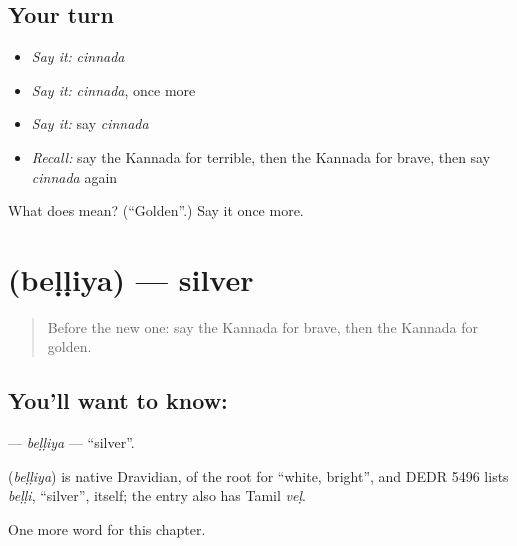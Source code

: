 \subsection*{Your turn}
\begin{itemize}
\raggedright
  \item \emph{Say it:} \emph{cinnada}
  \item \emph{Say it:} \emph{cinnada}, once more
  \item \emph{Say it:} say \emph{cinnada}
  \item \emph{Recall:} say the Kannada for terrible, then the Kannada for brave, then say \emph{cinnada} again
\end{itemize}

\begin{tcolorbox}[breakable,colback=teal!4,colframe=teal!35!black,title={Before you move on}]
What does  mean? (\textquotedblleft{}Golden\textquotedblright{}.) Say it once more.
\end{tcolorbox}
\section[\texorpdfstring{\kn{ಬೆಳ್ಳಿಯ} (beḷḷiya)}{ಬೆಳ್ಳಿಯ (beḷḷiya)}]{ (beḷḷiya) — silver}

\label{lesson:KA-C146-belliya}



\begin{quote}
Before the new one: say the Kannada for brave, then the Kannada for golden.
\end{quote}

\subsection*{You'll want to know: }
\textbf{} — \emph{beḷḷiya} — \textquotedblleft{}silver\textquotedblright{}.

\begin{cousinweb}
\textbf{} (\emph{beḷḷiya}) is native Dravidian, of the root for \textquotedblleft{}white, bright\textquotedblright{}, and DEDR 5496 lists \emph{beḷḷi}, \textquotedblleft{}silver\textquotedblright{}, itself; the entry also has Tamil \emph{veḷ}.
\end{cousinweb}

\begin{grammarlens}[title={What you've built}]
One more word for this chapter.
\end{grammarlens}

